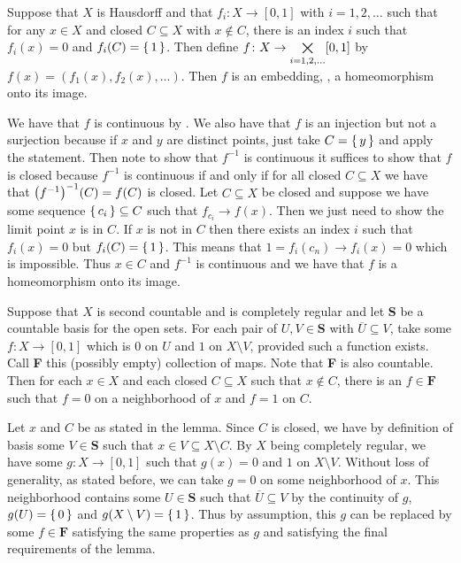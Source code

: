 \documentclass[letterpaper, 11pt, oneside]{book}
\begin{document}
\begin{lem}\label{lem: Hausdorff_and_comp_reg-ish_embedding}
  Suppose that $X$ is Hausdorff and that $f_{i}\colon X \to [0, 1]$ with $i = 1, 2, \ldots$ such that for any $x \in X$ and closed $C \subseteq X$ with $x \notin C$, there is an index $i$ such that $f_{i}(x) = 0$ and $f_{i}(C) = \set{1}$.
  Then define $f\colon X \to \bigtimes\limits_{i = 1, 2, \ldots} [0, 1]$ by $f(x) = (f_{1}(x), f_{2}(x), \ldots)$.
  Then $f$ is an embedding, \ie, a homeomorphism onto its image.
\end{lem}
\begin{pf}
  We have that $f$ is continuous by .
  We also have that $f$ is an injection but not a surjection because if $x$ and $y$ are distinct points, just take $C = \set{y}$ and apply the statement.
  Then note to show that $f^{-1}$ is continuous it suffices to show that $f$ is closed because $f^{-1}$ is continuous if and only if for all closed $C \subseteq X$ we have that $\pqty{f^{-1}}^{-1}(C) = f(C)$ is closed.
  Let $C \subseteq X$ be closed and suppose we have some sequence $\set{c_{i}} \subseteq C$ such that $f_{c_{i}} \to f(x)$.
  Then we just need to show the limit point $x$ is in $C$.
  If $x$ is not in $C$ then there exists an index $i$ such that $f_{i}(x) = 0$ but $f_{i}(C) = \set{1}$.
  This means that $1 = f_{i}(c_{n}) \to f_{i}(x) = 0$ which is impossible.
  Thus $x \in C$ and $f^{-1}$ is continuous and we have that $f$ is a homeomorphism onto its image.
\end{pf}

\begin{lem}\label{lem: second_count_comp_reg_family_F}
  Suppose that $X$ is second countable and is completely regular and let \textbf{S} be a countable basis for the open sets.
  For each pair of $U, V \in \textbf{S}$ with $\overline{U} \subseteq V$, take some $f\colon X \to [0, 1]$ which is $0$ on $U$ and $1$ on $X \setminus V$, provided such a function exists.
  Call \textbf{F} this (possibly empty) collection of maps.
  Note that \textbf{F} is also countable.
  Then for each $x \in X$ and each closed $C \subseteq X$ such that $x \notin C$, there is an $f \in \textbf{F}$ such that $f = 0$ on a neighborhood of $x$ and $f = 1$ on $C$.
\end{lem}
\begin{pf}
  Let $x$ and $C$ be as stated in the lemma.
  Since $C$ is closed, we have by definition of basis some $V \in \textbf{S}$ such that $x \in V \subseteq X \setminus C$.
  By $X$ being completely regular, we have some $g\colon X \to [0, 1]$ such that $g(x) = 0$ and $1$ on $X \setminus V$.
  Without loss of generality, as stated before, we can take $g = 0$ on some neighborhood of $x$.
  This neighborhood contains some $U \in \textbf{S}$ such that $\overline{U} \subseteq V$ by the continuity of $g$, $g(U) = \set{0}$ and $g(X \setminus V) = \set{1}$.
  Thus by assumption, this $g$ can be replaced by some $f \in \textbf{F}$ satisfying the same properties as $g$ and satisfying the final requirements of the lemma.
\end{pf}
\end{document}
